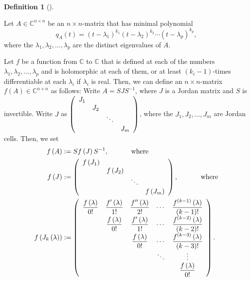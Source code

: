 \documentclass[numbers=enddot,12pt,final,onecolumn,notitlepage]{scrartcl}%
\numberwithin{exer}{subsection}
\theoremstyle{definition}
\newtheorem{defi}[theo]{Definition}
\newenvironment{definition}[1][]
{\begin{defi}[#1]\begin{leftbar}}
{\end{leftbar}\end{defi}}
\begin{document}
\begin{definition}
Let $A\in\mathbb{C}^{n\times n}$ be an $n\times n$-matrix that has minimal
polynomial%
\[
q_{A}\left(  t\right)  =\left(  t-\lambda_{1}\right)  ^{k_{1}}\left(
t-\lambda_{2}\right)  ^{k_{2}}\cdots\left(  t-\lambda_{p}\right)  ^{k_{p}},
\]
where the $\lambda_{1},\lambda_{2},\ldots,\lambda_{p}$ are the distinct
eigenvalues of $A$.

Let $f$ be a function from $\mathbb{C}$ to $\mathbb{C}$ that is defined at
each of the numbers $\lambda_{1},\lambda_{2},\ldots,\lambda_{p}$ and is
holomorphic at each of them, or at least $\left(  k_{i}-1\right)  $-times
differentiable at each $\lambda_{i}$ if $\lambda_{i}$ is real. Then, we can
define an $n\times n$-matrix $f\left(  A\right)  \in\mathbb{C}^{n\times n}$ as
follows: Write $A=SJS^{-1}$, where $J$ is a Jordan matrix and $S$ is
invertible. Write $J$ as $\left(
\begin{array}
[c]{cccc}%
J_{1} &  &  & \\
& J_{2} &  & \\
&  & \ddots & \\
&  &  & J_{m}%
\end{array}
\right)  $, where the $J_{1},J_{2},\ldots,J_{m}$ are Jordan cells. Then, we
set%
\begin{align*}
f\left(  A\right)   &  :=Sf\left(  J\right)  S^{-1}%
,\ \ \ \ \ \ \ \ \ \ \text{where}\\
f\left(  J\right)   &  :=\left(
\begin{array}
[c]{cccc}%
f\left(  J_{1}\right)  &  &  & \\
& f\left(  J_{2}\right)  &  & \\
&  & \ddots & \\
&  &  & f\left(  J_{m}\right)
\end{array}
\right)  ,\ \ \ \ \ \ \ \ \ \ \text{where}\\
f\left(  J_{k}\left(  \lambda\right)  \right)   &  :=\left(
\begin{array}
[c]{ccccc}%
\dfrac{f\left(  \lambda\right)  }{0!} & \dfrac{f^{\prime}\left(
\lambda\right)  }{1!} & \dfrac{f^{\prime\prime}\left(  \lambda\right)  }{2!} &
\cdots & \dfrac{f^{\left(  k-1\right)  }\left(  \lambda\right)  }{\left(
k-1\right)  !}\\
& \dfrac{f\left(  \lambda\right)  }{0!} & \dfrac{f^{\prime}\left(
\lambda\right)  }{1!} & \cdots & \dfrac{f^{\left(  k-2\right)  }\left(
\lambda\right)  }{\left(  k-2\right)  !}\\
&  & \dfrac{f\left(  \lambda\right)  }{0!} & \cdots & \dfrac{f^{\left(
k-3\right)  }\left(  \lambda\right)  }{\left(  k-3\right)  !}\\
&  &  & \ddots & \vdots\\
&  &  &  & \dfrac{f\left(  \lambda\right)  }{0!}%
\end{array}
\right)  .
\end{align*}

\end{definition}
\end{document}
